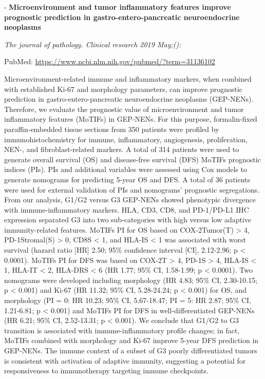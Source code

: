 \documentclass[]{article}
\begin{document}
 - \textbf{Microenvironment and tumor inflammatory features improve
prognostic prediction in gastro-entero-pancreatic neuroendocrine
neoplasms}

\emph{The journal of pathology. Clinical research 2019 May;():}

PubMed: \url{https://www.ncbi.nlm.nih.gov/pubmed/?term=31136102}

Microenvironment-related immune and inflammatory markers, when combined
with established Ki-67 and morphology parameters, can improve prognostic
prediction in gastro-entero-pancreatic neuroendocrine neoplasms
(GEP-NENs). Therefore, we evaluate the prognostic value of
microenvironment and tumor inflammatory features (MoTIFs) in GEP-NENs.
For this purpose, formalin-fixed paraffin-embedded tissue sections from
350 patients were profiled by immunohistochemistry for immune,
inflammatory, angiogenesis, proliferation, NEN-, and fibroblast-related
markers. A total of 314 patients were used to generate overall survival
(OS) and disease-free survival (DFS) MoTIFs prognostic indices (PIs).
PIs and additional variables were assessed using Cox models to generate
nomograms for predicting 5-year OS and DFS. A total of 36 patients were
used for external validation of PIs and nomograms' prognostic
segregations. From our analysis, G1/G2 versus G3 GEP-NENs showed
phenotypic divergence with immune-inflammatory markers. HLA, CD3, CD8,
and PD-1/PD-L1 IHC expression separated G3 into two sub-categories with
high versus low adaptive immunity-related features. MoTIFs PI for OS
based on COX-2Tumor(T) \textgreater{} 4, PD-1Stromal(S) \textgreater{}
0, CD8S \textless{} 1, and HLA-IS \textless{} 1 was associated with
worst survival (hazard ratio {[}HR{]} 2.50; 95\% confidence interval
{[}CI{]}, 2.12-2.96; p \textless{} 0.0001). MoTIFs PI for DFS was based
on COX-2T \textgreater{} 4, PD-1S \textgreater{} 4, HLA-IS \textless{}
1, HLA-IT \textless{} 2, HLA-DRS \textless{} 6 (HR 1.77; 95\% CI,
1.58-1.99; p \textless{} 0.0001). Two nomograms were developed including
morphology (HR 4.83; 95\% CI, 2.30-10.15; p \textless{} 0.001) and Ki-67
(HR 11.32; 95\% CI, 5.28-24.24; p \textless{} 0.001) for OS, and
morphology (PI = 0: HR 10.23; 95\% CI, 5.67-18.47; PI = 5: HR 2.87; 95\%
CI, 1.21-6.81; p \textless{} 0.001) and MoTIFs PI for DFS in
well-differentiated GEP-NENs (HR 6.21; 95\% CI, 2.52-13.31; p
\textless{} 0.001). We conclude that G1/G2 to G3 transition is
associated with immune-inflammatory profile changes; in fact, MoTIFs
combined with morphology and Ki-67 improve 5-year DFS prediction in
GEP-NENs. The immune context of a subset of G3 poorly differentiated
tumors is consistent with activation of adaptive immunity, suggesting a
potential for responsiveness to immunotherapy targeting immune
checkpoints.
\end{document}
